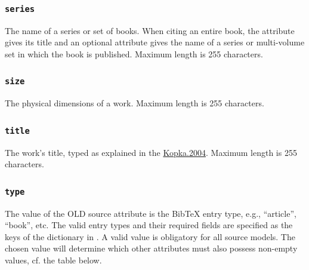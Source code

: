\documentclass[letterpaper,10pt,english]{sphinxmanual}
\begin{document}
\subsubsection{\texttt{series}}
\label{datastructure:series}
The name of a series or set of books. When citing an entire book, the 
attribute gives its title and an optional  attribute gives the name of
a series or multi-volume set in which the book is published.  Maximum length is
255 characters.


\subsubsection{\texttt{size}}
\label{datastructure:id44}
The physical dimensions of a work.  Maximum length is 255 characters.


\subsubsection{\texttt{title}}
\label{datastructure:id45}
The work's title, typed as explained in the {\hyperref[datastructure:kopka-2004]{Kopka.2004}}.  Maximum length is 255
characters.


\subsubsection{\texttt{type}}
\label{datastructure:id46}
The value of the OLD source  attribute is the BibTeX entry type, e.g.,
``article'', ``book'', etc.  The valid entry types and their required fields are
specified as the keys of the  dictionary in .  A
valid  value is obligatory for all source models.  The chosen 
value will determine which other attributes must also possess non-empty values,
cf. the table below.
\end{document}
